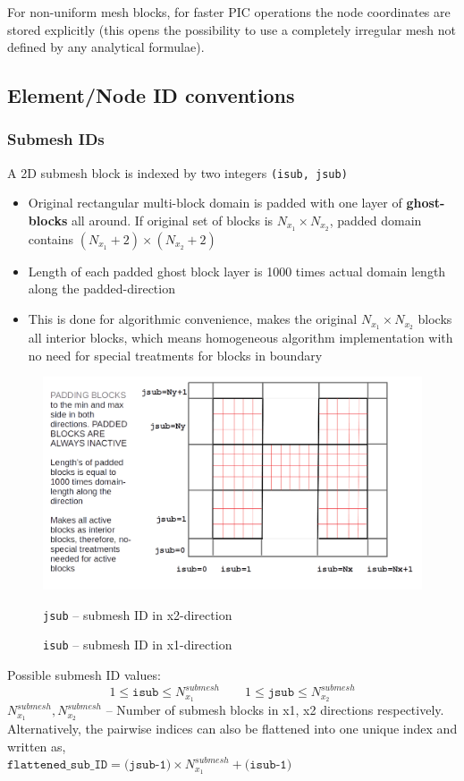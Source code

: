 \documentclass[a4paper,12pt]{article}
\begin{document}
For non-uniform mesh blocks, for faster PIC operations the node coordinates are stored explicitly (this opens the possibility to use a completely irregular mesh not defined by any analytical formulae).

\subsection{Element/Node ID conventions}
\subsubsection{Submesh IDs}
A 2D submesh block is indexed by two integers \texttt{(isub, jsub)}

\begin{itemize}
	\item Original rectangular multi-block domain is padded with one layer of \textbf{ghost-blocks} all around. If original set of blocks is $N_{x_1}\times N_{x_2}$, padded domain contains $(N_{x_1}+2)\times (N_{x_2}+2)$
	\item Length of each padded ghost block layer is 1000 times actual domain length along the padded-direction
	\item This is done for algorithmic convenience, makes the original $N_{x_1}\times N_{x_2}$ blocks all interior blocks, which means homogeneous algorithm implementation with no need for special treatments for blocks in boundary
\end{itemize}
\begin{figure}[H]
	\centering
	\includegraphics[trim=250 0 0 0,clip,scale=0.35]{figures/Block-Padding-2D.png}
	\caption{\texttt{isub} -- submesh ID in x1-direction}{\texttt{jsub} -- submesh ID in x2-direction}			
\end{figure}
\noindent Possible submesh ID values:
\begin{equation*}
1 \le \texttt{isub} \le N^{submesh}_{x_1} \qquad 1 \le \texttt{jsub} \le N^{submesh}_{x_2}
\end{equation*}
$N^{submesh}_{x_1},N^{submesh}_{x_2}$ -- Number of submesh blocks in x1, x2 directions respectively. Alternatively, the pairwise indices can also be flattened into one unique index and written as,\\
$\texttt{flattened\_sub\_ID} = \texttt{(jsub-1)} \times N^{submesh}_{x_1} + \texttt{(isub-1)}$
\end{document}
